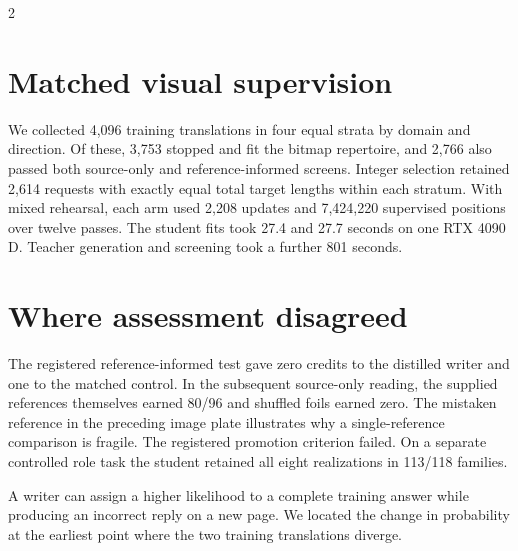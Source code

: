 \begin{multicols}{2}
\section*{Matched visual supervision}
We collected 4,096 training translations in four equal strata by domain and direction. Of these, 3,753 stopped and fit the bitmap repertoire, and 2,766 also passed both source-only and reference-informed screens. Integer selection retained 2,614 requests with exactly equal total target lengths within each stratum. With mixed rehearsal, each arm used 2,208 updates and 7,424,220 supervised positions over twelve passes. The student fits took 27.4 and 27.7 seconds on one RTX 4090 D. Teacher generation and screening took a further 801 seconds.
\section*{Where assessment disagreed}
The registered reference-informed test gave zero credits to the distilled writer and one to the matched control. In the subsequent source-only reading, the supplied references themselves earned 80/96 and shuffled foils earned zero. The mistaken reference in the preceding image plate illustrates why a single-reference comparison is fragile. The registered promotion criterion failed. On a separate controlled role task the student retained all eight realizations in 113/118 families.
\end{multicols}
\newpage
{}
\noindent A writer can assign a higher likelihood to a complete training answer while producing an incorrect reply on a new page. We located the change in probability at the earliest point where the two training translations diverge.
